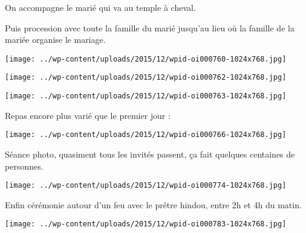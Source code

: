 On accompagne le marié qui va au temple à cheval.

Puis procession avec toute la famille du marié jusqu'au lieu où la famille de la mariée organise le mariage. 
\begin{center} \texttt{[image: ../wp-content/uploads/2015/12/wpid-oi000760-1024x768.jpg]} \end{center}
\begin{center} \texttt{[image: ../wp-content/uploads/2015/12/wpid-oi000762-1024x768.jpg]} \end{center}
\begin{center} \texttt{[image: ../wp-content/uploads/2015/12/wpid-oi000763-1024x768.jpg]} \end{center}
\pagebreak

Repas encore plus varié que le premier jour : 
\begin{center} \texttt{[image: ../wp-content/uploads/2015/12/wpid-oi000766-1024x768.jpg]} \end{center}

Séance photo, quasiment tous les invités passent, ça fait quelques centaines de personnes. 
\begin{center} \texttt{[image: ../wp-content/uploads/2015/12/wpid-oi000774-1024x768.jpg]} \end{center}
\pagebreak

Enfin cérémonie autour d'un feu avec le prêtre hindou, entre 2h et 4h du matin. 
\begin{center} \texttt{[image: ../wp-content/uploads/2015/12/wpid-oi000783-1024x768.jpg]} \end{center}
